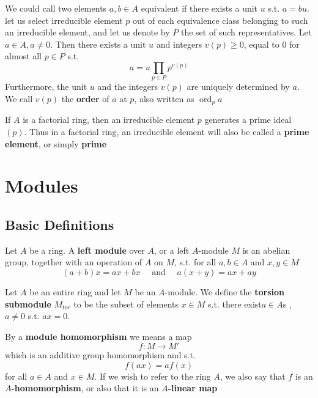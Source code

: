 \documentclass[11pt]{article}
\def \ord {\operatorname{ord}}
\begin{document}
We could call two elements \(a,b\in A\) equivalent if there exists a unit \(u\) s.t. \(a=bu\). let
us select irreducible element \(p\) out of each equivalence class belonging to such an
irreducible element, and let us denote by \(P\) the set of such representatives.
Let \(a\in A,a\neq 0\). Then there exists a unit \(u\) and integers \(v(p)\ge 0\), equal to 0 for almost
all \(p\in P\) s.t.
\begin{equation*}
a=u\prod_{p\in P}p^{v(p)}
\end{equation*}
Furthermore, the unit \(u\) and the integers \(v(p)\) are uniquely determined by \(a\). We
call \(v(p)\) the \textbf{order} of \(a\) at \(p\), also written as \(\ord_pa\)

If \(A\) is a factorial ring, then an irreducible element \(p\) generates a prime ideal \((p)\).
Thus in a factorial ring, an irreducible element will also be called a \textbf{prime element}, or simply \textbf{prime}


\section{Modules}
\label{sec:orgdcee263}

\subsection{Basic Definitions}
\label{sec:org659b735}
Let \(A\) be a ring. A \textbf{left module} over \(A\), or a left \(A\)-module \(M\) is an abelian group,
together with an operation of \(A\) on \(M\), s.t. for all \(a,b\in A\) and \(x,y\in M\)
\begin{equation*}
(a+b)x=ax+bx \quad\text{ and }\quad a(x+y)=ax+ay
\end{equation*}

Let \(A\) be an entire ring and let \(M\) be an \(A\)-module. We define the \textbf{torsion
submodule} \(M_{tor}\) to be the subset of elements \(x\in M\) s.t. there exist\(a\in A\)s , \(a\neq 0\)
s.t. \(ax=0\).

By a \textbf{module homomorphism} we means a map
\begin{equation*}
f:M\to M'
\end{equation*}
which is an additive group homomorphism and s.t.
\begin{equation*}
f(ax)=af(x)
\end{equation*}
for all \(a\in A\) and \(x\in M\). If we wish to refer to the ring \(A\), we also say that \(f\) is
an \textbf{\(A\)-homomorphism}, or also that it is an \textbf{\(A\)-linear map}
\end{document}
